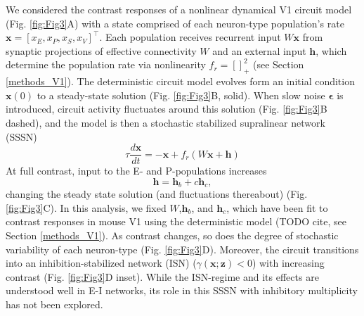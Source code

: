 \documentclass[11pt]{article}
\begin{document}
We considered the contrast responses of a nonlinear dynamical V1 circuit model (Fig. \ref{fig:Fig3}A) with a state comprised of each neuron-type population's rate $\mathbf{x} = \left[x_E, x_P , x_S, x_V \right]^\top$.
Each population receives recurrent input $W \mathbf{x}$ from synaptic projections of effective connectivity $W$ and an external input $\mathbf{h}$, which determine the population rate via nonlinearity $f_r = \left[\right]^2_+$ (see Section \ref{methods_V1}).
The deterministic circuit model evolves form an initial condition $\mathbf{x}(0)$ to a steady-state solution (Fig. \ref{fig:Fig3}B, solid).
When slow noise $\mathbf{\epsilon}$ is introduced, circuit activity fluctuates around this solution (Fig. \ref{fig:Fig3}B dashed), and the model is then a stochastic stabilized supralinear network (SSSN) \cite{hennequin2018dynamical} 
\begin{equation}
    \tau \frac{d\mathbf{x}}{dt} = -\mathbf{x} +f_r(W\mathbf{x} + \mathbf{h})
\end{equation}
At full contrast, input to the E- and P-populations increases 
\begin{equation}
\mathbf{h} = \mathbf{h}_b + c\mathbf{h}_c,
\end{equation}
changing the steady state solution (and fluctuations thereabout)  (Fig. \ref{fig:Fig3}C).
In this analysis, we fixed $W$,$\mathbf{h}_b$, and $\mathbf{h}_c$, which have been fit to contrast responses in mouse V1 using the deterministic model (TODO cite, see Section \ref{methods_V1}).
As contrast changes, so does the degree of stochastic variability of each neuron-type (Fig. \ref{fig:Fig3}D).
Moreover, the circuit transitions into an inhibition-stabilized network (ISN) ($\gamma(\mathbf{x}; \mathbf{z}) < 0$) with increasing contrast (Fig. \ref{fig:Fig3}D inset).
While the ISN-regime and its effects are understood well in E-I networks, its role in this SSSN with inhibitory multiplicity has not been explored.
\end{document}
